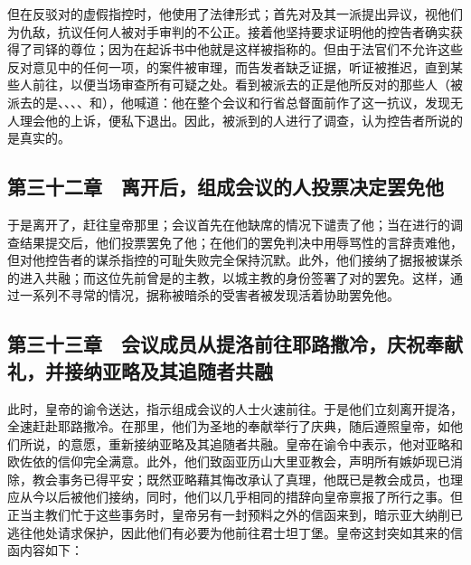 但在反驳对的虚假指控时，他使用了法律形式；首先对及其一派提出异议，视他们为仇敌，抗议任何人被对手审判的不公正。接着他坚持要求证明他的控告者确实获得了司铎的尊位；因为在起诉书中他就是这样被指称的。但由于法官们不允许这些反对意见中的任何一项，的案件被审理，而告发者缺乏证据，听证被推迟，直到某些人前往，以便当场审查所有可疑之处。看到被派去的正是他所反对的那些人（被派去的是、、、、和），他喊道：他在整个会议和行省总督面前作了这一抗议，发现无人理会他的上诉，便私下退出。因此，被派到的人进行了调查，认为控告者所说的是真实的。\par


\subsection{第三十二章　离开后，组成会议的人投票决定罢免他}

于是离开了，赶往皇帝那里；会议首先在他缺席的情况下谴责了他；当在进行的调查结果提交后，他们投票罢免了他；在他们的罢免判决中用辱骂性的言辞责难他，但对他控告者的谋杀指控的可耻失败完全保持沉默。此外，他们接纳了据报被谋杀的进入共融；而这位先前曾是的主教，以城主教的身份签署了对的罢免。这样，通过一系列不寻常的情况，据称被暗杀的受害者被发现活着协助罢免他。\par


\subsection{第三十三章　会议成员从提洛前往耶路撒冷，庆祝奉献礼，并接纳亚略及其追随者共融}

此时，皇帝的谕令送达，指示组成会议的人士火速前往。于是他们立刻离开提洛，全速赶赴耶路撒冷。在那里，他们为圣地的奉献举行了庆典，随后遵照皇帝，如他们所说，的意愿，重新接纳亚略及其追随者共融。皇帝在谕令中表示，他对亚略和欧佐依的信仰完全满意。此外，他们致函亚历山大里亚教会，声明所有嫉妒现已消除，教会事务已得平安；既然亚略藉其悔改承认了真理，他既已是教会成员，也理应从今以后被他们接纳，同时，他们以几乎相同的措辞向皇帝禀报了所行之事。但正当主教们忙于这些事务时，皇帝另有一封预料之外的信函来到，暗示亚大纳削已逃往他处请求保护，因此他们有必要为他前往君士坦丁堡。皇帝这封突如其来的信函内容如下：\par


